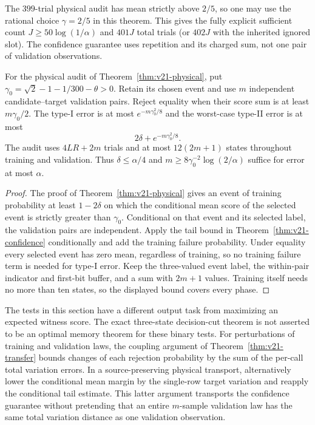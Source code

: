 The $399$-trial physical audit has mean strictly above $2/5$, so one may
use the rational choice $\gamma=2/5$ in this theorem. This gives the
fully explicit sufficient count $J\ge50\log(1/\alpha)$ and
$401J$ total trials (or $402J$ with the inherited ignored slot). The
confidence guarantee uses repetition and its charged sum, not one pair
of validation observations.

\begin{theorem}
\label{thm:v21-fixedwitness}
For the physical audit of Theorem~\ref{thm:v21-physical}, put
$\gamma_0=\sqrt2-1-1/300-\theta>0$. Retain its chosen event and use
$m$ independent candidate--target validation pairs. Reject equality when
their score sum is at least $m\gamma_0/2$. The type-I error is at most
$e^{-m\gamma_0^2/8}$ and the worst-case type-II error is at most
\[
 2\delta+e^{-m\gamma_0^2/8}.
\]
The audit uses $4LR+2m$ trials and at most $12(2m+1)$ states throughout
training and validation. Thus $\delta\le\alpha/4$ and
$m\ge8\gamma_0^{-2}\log(2/\alpha)$ suffice for error at most $\alpha$.
\end{theorem}
\begin{proof}
The proof of Theorem~\ref{thm:v21-physical} gives an event of training
probability at least $1-2\delta$ on which the conditional mean score of
the selected event is strictly greater than $\gamma_0$. Conditional on
that event and its selected label, the validation pairs are independent.
Apply the tail bound in Theorem~\ref{thm:v21-confidence} conditionally
and add the training failure probability. Under equality every selected
event has zero mean, regardless of training, so no training failure term
is needed for type-I error. Keep the three-valued event label, the
within-pair indicator and first-bit buffer, and a sum with $2m+1$
values. Training itself needs no more than ten states, so the displayed
bound covers every phase.
\end{proof}

The tests in this section have a different output task from maximizing
an expected witness score. The exact three-state decision-cut theorem is
not asserted to be an optimal memory theorem for these binary tests.
For perturbations of training and validation laws, the coupling argument
of Theorem~\ref{thm:v21-transfer} bounds changes of each rejection
probability by the sum of the per-call total variation errors. In a
source-preserving physical transport, alternatively lower the conditional
mean margin by the single-row target variation and reapply the conditional
tail estimate. This latter argument transports the confidence guarantee
without pretending that an entire $m$-sample validation law has the
same total variation distance as one validation observation.
